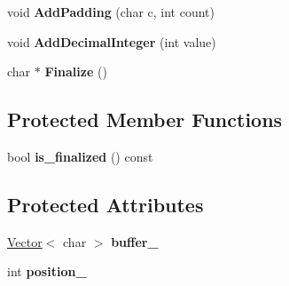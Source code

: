 \begin{DoxyCompactItemize}
\item 
void {\bfseries Add\+Padding} (char c, int count)\hypertarget{classv8_1_1internal_1_1_simple_string_builder_a550e57aa8ec2df7143c5e864b6ae5402}{}\label{classv8_1_1internal_1_1_simple_string_builder_a550e57aa8ec2df7143c5e864b6ae5402}

\item 
void {\bfseries Add\+Decimal\+Integer} (int value)\hypertarget{classv8_1_1internal_1_1_simple_string_builder_a169f40e57341232ced1e8ac1e23fdbad}{}\label{classv8_1_1internal_1_1_simple_string_builder_a169f40e57341232ced1e8ac1e23fdbad}

\item 
char $\ast$ {\bfseries Finalize} ()\hypertarget{classv8_1_1internal_1_1_simple_string_builder_ab6aebcff188bdab258d9c139e29543e4}{}\label{classv8_1_1internal_1_1_simple_string_builder_ab6aebcff188bdab258d9c139e29543e4}

\end{DoxyCompactItemize}
\subsection*{Protected Member Functions}
\begin{DoxyCompactItemize}
\item 
bool {\bfseries is\+\_\+finalized} () const \hypertarget{classv8_1_1internal_1_1_simple_string_builder_a665668d78de473dbec74ba513b377ecb}{}\label{classv8_1_1internal_1_1_simple_string_builder_a665668d78de473dbec74ba513b377ecb}

\end{DoxyCompactItemize}
\subsection*{Protected Attributes}
\begin{DoxyCompactItemize}
\item 
\hyperlink{classv8_1_1internal_1_1_vector}{Vector}$<$ char $>$ {\bfseries buffer\+\_\+}\hypertarget{classv8_1_1internal_1_1_simple_string_builder_a2e7d92b54792ab26c3bff5f96de202fc}{}\label{classv8_1_1internal_1_1_simple_string_builder_a2e7d92b54792ab26c3bff5f96de202fc}

\item 
int {\bfseries position\+\_\+}\hypertarget{classv8_1_1internal_1_1_simple_string_builder_a0deafc31ecda5d1800219fc4232565c5}{}\label{classv8_1_1internal_1_1_simple_string_builder_a0deafc31ecda5d1800219fc4232565c5}

\end{DoxyCompactItemize}
